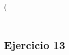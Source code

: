 \left( \documentclass[10pt,a4paper]{article}
\begin{document}
\subsubsection{}
    \begin{lstlisting}
    \end{lstlisting}
\subsection{Ejercicio 13}
\subsubsection{}
    \begin{lstlisting}
    \end{lstlisting}
\subsubsection{}
    \begin{lstlisting}
    \end{lstlisting}
\subsubsection{}
    \begin{lstlisting}
    \end{lstlisting}
\subsubsection{}
    \begin{lstlisting}
    \end{lstlisting}
\subsubsection{}
    \begin{lstlisting}
    \end{lstlisting}
\subsubsection{}
    \begin{lstlisting}
    \end{lstlisting}
\end{document}
